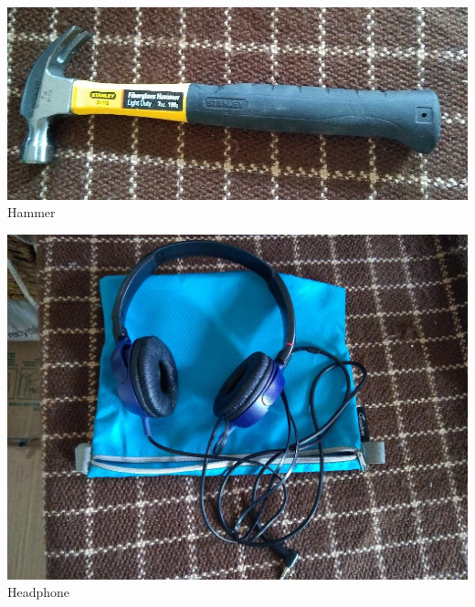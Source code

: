 \documentclass[t]{beamer}
\newcommand{\htarget}[2]{\hypertarget{#1}{#2}}
\begin{document}
\begin{frame}\htarget{hammer}{} \begin{center}
\includegraphics[width=\textwidth]{hammer_mini.jpg} \\
Hammer
\end{center} \end{frame}
\begin{frame}\htarget{headphone}{} \begin{center}
\includegraphics[height=0.8\textheight]{headphone_mini.jpg} \\
Headphone
\end{center} \end{frame}
\end{document}
